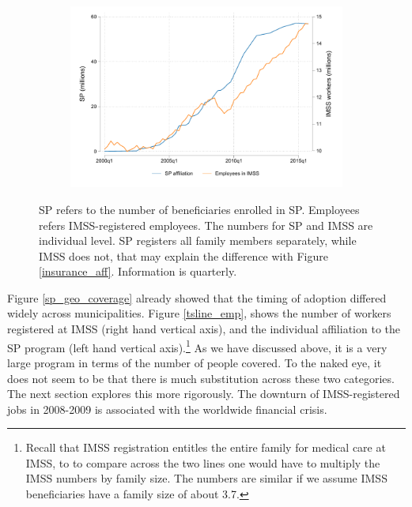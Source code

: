 \documentclass[oneside,11pt]{article}
\begin{document}
\vspace{.2in}
\begin{figure}[H]
     \caption{Roll-out of Seguro Popular (replication)}
     \vspace{-.2in}
    \label{tsline_emp}
\begin{center}
\begin{subfigure}{0.65\textwidth}
        \includegraphics[width=\textwidth]{Figuras/tsline_emp_sp.pdf}
    \end{subfigure}
  \end{center}
  \vspace{-.15in}
    \scriptsize 
    SP refers to the number of beneficiaries enrolled in SP. Employees refers IMSS-registered employees. The numbers for SP and IMSS are individual level. SP registers all family members separately, while IMSS does not, that may explain the difference with Figure \ref{insurance_aff}. Information is quarterly.
    
\end{figure}


Figure \ref{sp_geo_coverage} already showed that the timing of adoption differed widely across municipalities. Figure \ref{tsline_emp}, shows the number of workers registered at IMSS (right hand vertical axis), and the individual affiliation to the SP program (left hand vertical axis).\footnote{Recall that IMSS registration entitles the entire family for medical care at IMSS, to to compare across the two lines one would have to multiply the IMSS numbers by family size. The numbers are similar if we assume IMSS beneficiaries have a family size of about 3.7.} As we have discussed above, it is a very large program in terms of the number of people covered. To the naked eye, it does not seem to be that there is much substitution across these two categories. The next section explores this more rigorously. The downturn of IMSS-registered jobs in 2008-2009 is associated with the worldwide financial crisis. 
\end{document}
